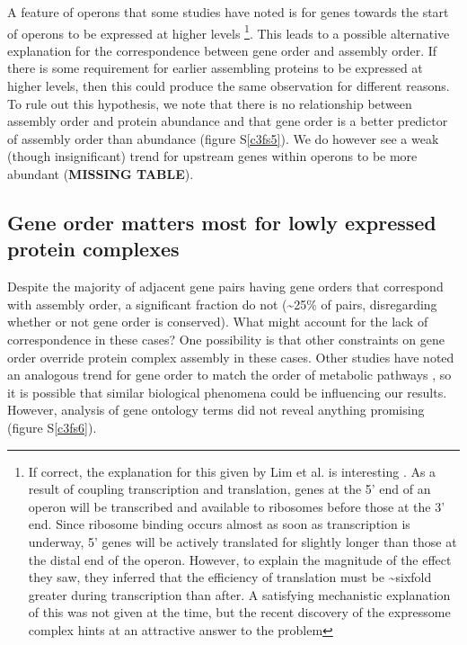 \documentclass[a4paper,11pt,twoside,openright]{scrbook}
\begin{document}
A feature of operons that some studies have noted is for genes towards the start of operons to be expressed at higher levels \cite{Nishizaki2007,Lim2011} \footnote{If correct, the explanation for this given by Lim et al. is interesting \cite{Lim2011}. As a result of coupling transcription and translation, genes at the 5' end of an operon will be transcribed and available to ribosomes before those at the 3' end. Since ribosome binding occurs almost as soon as transcription is underway, 5' genes will be actively translated for slightly longer than those at the distal end of the operon. However, to explain the magnitude of the effect they saw, they inferred that the efficiency of translation must be \textasciitilde sixfold greater during transcription than after. A satisfying mechanistic explanation of this was not given at the time, but the recent discovery of the expressome complex \cite{Kohler2017} hints at an attractive answer to the problem}. This leads to a possible alternative explanation for the correspondence between gene order and assembly order. If there is some requirement for earlier assembling proteins to be expressed at higher levels, then this could produce the same observation for different reasons. To rule out this hypothesis, we note that there is no relationship between assembly order and protein abundance and that gene order is a better predictor of assembly order than abundance (figure S\ref{c3fs5}). We do however see a weak (though insignificant) trend for upstream genes within operons to be more abundant (\textbf{MISSING TABLE}).

\subsection{Gene order matters most for lowly expressed protein complexes}
Despite the majority of adjacent gene pairs having gene orders that correspond with assembly order, a significant fraction do not (\textasciitilde 25\% of pairs, disregarding whether or not gene order is conserved). What might account for the lack of correspondence in these cases? One possibility is that other constraints on gene order override protein complex assembly in these cases. Other studies have noted an analogous trend for gene order to match the order of metabolic pathways \cite{Zaslaver2004,Kovacs2009}, so it is possible that similar biological phenomena could be influencing our results. However, analysis of gene ontology terms \cite{Huntley2015} did not reveal anything promising (figure S\ref{c3fs6}).
\end{document}

